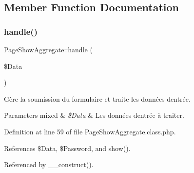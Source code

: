 \subsection{Member Function Documentation}
\mbox{\label{class_page_show_aggregate_afc4bd6c13d8f52ef14bb372abe533db2}} 
\subsubsection{\texorpdfstring{handle()}{handle()}}
{\footnotesize\ttfamily Page\+Show\+Aggregate\+::handle (\begin{DoxyParamCaption}\item[{}]{\$\+Data }\end{DoxyParamCaption})\hspace{0.3cm}{\ttfamily [protected]}}

Gère la soumission du formulaire et traite les données d\textquotesingle{}entrée.


\begin{DoxyParams}[1]{Parameters}
mixed & {\em \$\+Data} & Les données d\textquotesingle{}entrée à traiter. \\
\hline
\end{DoxyParams}


Definition at line 59 of file Page\+Show\+Aggregate.\+class.\+php.



References \$\+Data, \$\+Password, and show().



Referenced by \+\_\+\+\_\+construct().

